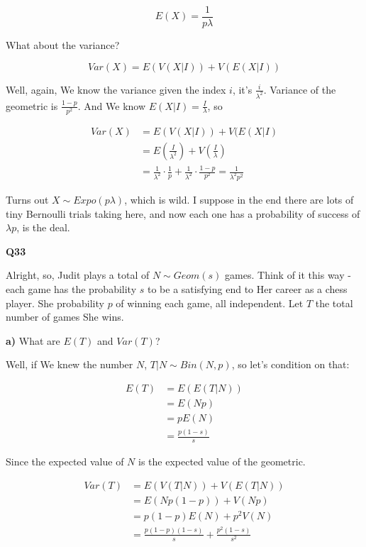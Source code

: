 \documentclass{article}
\begin{document}
			\[ E(X) = \frac{1}{p\lambda} \]
		
			What about the variance? 

			\[Var(X) = E(V(X|I)) + V(E(X|I)) \]			
						
			Well, again, We know the variance given the index $i$, it's $\frac{i}{\lambda^2}$. Variance of the geometric is $\frac{1-p}{p^2}$. And We know $E(X|I) = \frac{I}{\lambda}$, so
			
			\begin{align*}
			Var(X) &= E(V(X|I)) + V(E(X|I)\\
			&= E\left(\frac{I}{\lambda^2} \right) + V\left(\frac{I}{\lambda} \right) \\	
			&= \frac{1}{\lambda^2}\cdot\frac{1}{p} + \frac{1}{\lambda^2}\cdot \frac{1-p}{p^2} = \frac{1}{\lambda^2p^2}		
			\end{align*}
		
			Turns out $X\sim Expo(p\lambda)$, which is wild. I suppose in the end there are lots of tiny Bernoulli trials taking here, and now each one has a probability of success of $\lambda p$, is the deal.
			
			\hfill
			
		\textbf{Q33}
		
			Alright, so, Judit plays a total of $N\sim Geom(s)$ games. Think of it this way - each game has the probability $s$ to be a satisfying end to Her career as a chess player. She probability $p$ of winning each game, all independent. Let $T$ the total number of games She wins. 
			
			\textbf{a)} What are $E(T)$ and $Var(T)$?
			
			Well, if We knew the number $N$, $T|N\sim Bin(N, p)$, so let's condition on that:
			
			\begin{align*}
			E(T) &= E(E(T|N))\\
			&= E(Np)\\
			&= pE(N)\\
			&= \frac{p(1-s)}{s}
			\end{align*}
			
			Since the expected value of $N$ is the expected value of the geometric.
			
			\begin{align*}
			Var(T) &= E(V(T|N))+V(E(T|N))\\
			&= E(Np(1-p))+V(Np)\\
			&=p(1-p)E(N)+p^2V(N)\\
			&=\frac{p(1-p)(1-s)}{s} + \frac{p^2(1-s)}{s^2}
			\end{align*}
\end{document}
